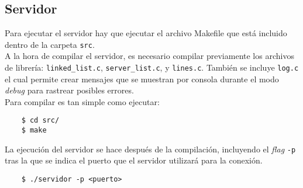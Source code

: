 \subsection{Servidor}

Para ejecutar el servidor hay que ejecutar el archivo Makefile que está incluido dentro de la carpeta \texttt{src}.\\

A la hora de compilar el servidor, es necesario compilar previamente los archivos de
librería: \texttt{linked\_list.c}, \texttt{server\_list.c}, y \texttt{lines.c}. También se incluye \texttt{log.c} el cual permite crear mensajes que se muestran por consola durante el modo \textit{debug} para rastrear posibles errores.\\

Para compilar es tan simple como ejecutar:
\begin{lstlisting}
    $ cd src/
    $ make
\end{lstlisting}

La ejecución del servidor se hace después de la compilación, incluyendo el \textit{flag} \texttt{-p} tras la que se indica el puerto que el servidor utilizará para la conexión.
\begin{lstlisting}
    $ ./servidor -p <puerto>
\end{lstlisting}